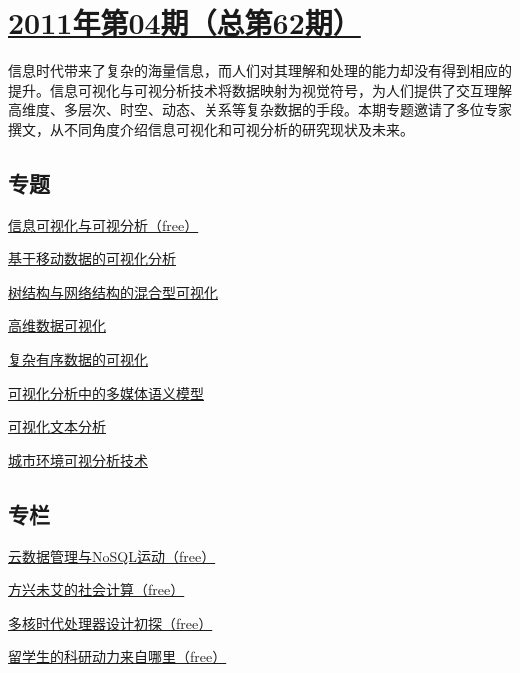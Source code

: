 \documentclass[a4paper]{article}
\begin{document}
\section{\href{http://history.ccf.org.cn/sites/ccf/jsjtbbd.jsp?contentId=2606489336780}{\textbf{2011年第04期（总第62期）}}}
信息时代带来了复杂的海量信息，而人们对其理解和处理的能力却没有得到相应的提升。信息可视化与可视分析技术将数据映射为视觉符号，为人们提供了交互理解高维度、多层次、时空、动态、关系等复杂数据的手段。本期专题邀请了多位专家撰文，从不同角度介绍信息可视化和可视分析的研究现状及未来。
\subsection{专题}
\href{http://history.ccf.org.cn/resources/1190201776262/2011/04/20/1.pdf}{信息可视化与可视分析（free）}

\href{http://history.ccf.org.cn/resources/1190201776262/2011/04/20/7.pdf}{基于移动数据的可视化分析}

\href{http://history.ccf.org.cn/resources/1190201776262/2011/04/20/2.pdf}{树结构与网络结构的混合型可视化}

\href{http://history.ccf.org.cn/resources/1190201776262/2011/04/20/3.pdf}{高维数据可视化}

\href{http://history.ccf.org.cn/resources/1190201776262/2011/04/20/4.pdf}{复杂有序数据的可视化}

\href{http://history.ccf.org.cn/resources/1190201776262/2011/04/20/5.pdf}{可视化分析中的多媒体语义模型}

\href{http://history.ccf.org.cn/resources/1190201776262/2011/04/20/6.pdf}{可视化文本分析}

\href{http://history.ccf.org.cn/resources/1190201776262/2011/04/20/8.pdf}{城市环境可视分析技术}

\subsection{专栏}
\href{http://history.ccf.org.cn/resources/1190201776262/2011/04/21/12.pdf}{云数据管理与NoSQL运动（free）}

\href{http://history.ccf.org.cn/resources/1190201776262/2011/04/20/13.pdf}{方兴未艾的社会计算（free）}

\href{http://history.ccf.org.cn/resources/1190201776262/2011/04/20/14.pdf}{多核时代处理器设计初探（free）}

\href{http://history.ccf.org.cn/resources/1190201776262/2011/04/20/15.pdf}{留学生的科研动力来自哪里（free）}
\end{document}
